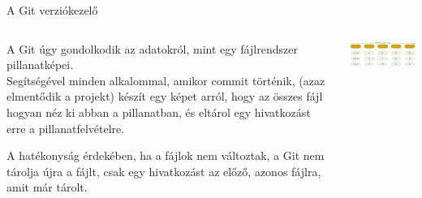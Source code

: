 \documentclass[english, aspectratio=169]{beamer}
\begin{document}
\begin{frame}{A Git verziókezelő}
\begin{columns}
\begin{column}{0.5\textwidth}
A Git úgy gondolkodik az adatokról, mint egy fájlrendszer pillanatképei. 
\\Segítségével minden alkalommal, amikor commit történik, (azaz elmentődik a projekt) készít egy képet arról, hogy az összes fájl hogyan néz ki abban a pillanatban, és eltárol egy hivatkozást erre a pillanatfelvételre. \par\smallskip
A hatékonyság érdekében, ha a fájlok nem változtak, a Git nem tárolja újra a fájlt, csak egy hivatkozást az előző, azonos fájlra, amit már tárolt.
\end{column}
\begin{column}{0.5\textwidth}
\begin{center}
\includegraphics[width=7cm, keepaspectratio]{images/git_1.png}
\end{center}
\end{column}
\end{columns}
\end{frame}
\end{document}
